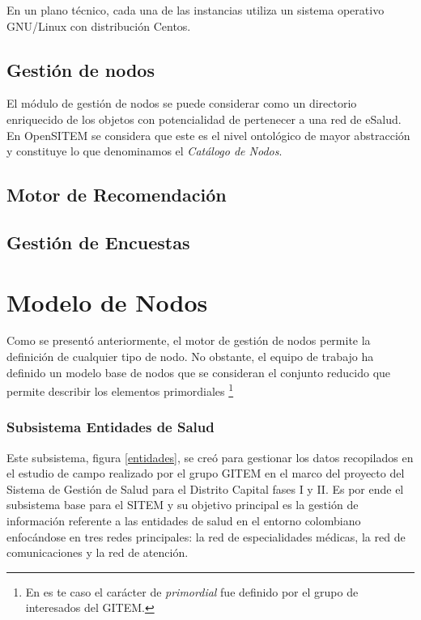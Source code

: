 En un plano técnico, cada una de las instancias utiliza un sistema operativo GNU/Linux con distribución Centos.


\subsection{Gestión de nodos}

El módulo de gestión de nodos se puede considerar como un directorio enriquecido de los objetos con potencialidad de pertenecer a una red de eSalud. En OpenSITEM se considera que este es el nivel ontológico de mayor abstracción y constituye lo que denominamos el \textit{Catálogo de Nodos}.




\subsection{Motor de Recomendación}


\subsection{Gestión de Encuestas}






\section{Modelo de Nodos}

Como se presentó anteriormente, el motor de gestión de nodos permite la definición de cualquier tipo de nodo. No obstante, el equipo de trabajo ha definido un modelo base de nodos que se consideran el conjunto reducido que permite describir los elementos primordiales \footnote{En es te caso el carácter de \textit{primordial} fue definido por el grupo de interesados del GITEM.}

















\subsubsection{Subsistema Entidades de Salud} 
Este subsistema, figura \ref{entidades}, se creó para gestionar los datos recopilados en el estudio de campo realizado por el grupo GITEM en el marco del proyecto del Sistema de Gestión de Salud para el Distrito Capital fases I y II. Es por ende el subsistema base para el SITEM y su objetivo principal es la gestión de información referente a las entidades de salud en el entorno colombiano enfocándose en tres redes principales: la red de especialidades médicas, la red de comunicaciones y la red de atención.

